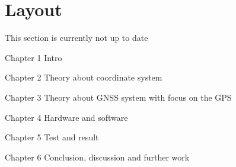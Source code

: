 
\section{Layout}
This section is currently not up to date

Chapter 1 Intro

Chapter 2 Theory about coordinate system

Chapter 3 Theory about GNSS system with focus on the GPS

Chapter 4 Hardware and software

Chapter 5 Test and result

Chapter 6 Conclusion, discussion and further work


